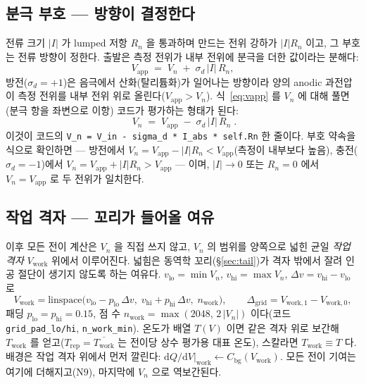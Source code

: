 \documentclass[11pt,a4paper]{article}
\newcommand{\dd}{\mathrm{d}}
\newcommand{\app}{\mathrm{app}}
\newcommand{\bg}{\mathrm{bg}}
\newcommand{\work}{\mathrm{work}}
\newcommand{\code}[1]{\texttt{#1}}
\begin{document}
\subsection{분극 부호 — 방향이 결정한다}
전류 크기 $|I|$ 가 lumped 저항 $R_n$ 을 통과하며 만드는 전위 강하가 $|I|R_n$ 이고, 그 부호는 전류 방향이 정한다.
출발은 측정 전위가 내부 전위에 분극을 더한 값이라는 분해다:
\begin{equation}
V_\app\;=\;V_n\;+\;\sigma_d\,|I|\,R_n,
\label{eq:vapp}
\end{equation}
방전($\sigma_d=+1$)은 음극에서 산화(탈리튬화)가 일어나는 방향이라 양의 anodic 과전압이 측정 전위를 내부 전위 위로
올린다($V_\app>V_n$). 식~\eqref{eq:vapp} 를 $V_n$ 에 대해 풀면(분극 항을 좌변으로 이항) 코드가 평가하는 형태가 된다:
\begin{equation}
\boxed{\;V_n\;=\;V_\app\;-\;\sigma_d\,|I|\,R_n\;.}
\label{eq:vn}
\end{equation}
이것이 코드의 \code{V\_n = V\_in - sigma\_d * I\_abs * self.Rn} 한 줄이다. 부호 약속을 식으로 확인하면 —
방전에서 $V_n=V_\app-|I|R_n<V_\app$(측정이 내부보다 높음), 충전($\sigma_d=-1$)에서 $V_n=V_\app+|I|R_n>V_\app$ — 이며,
$|I|\to0$ 또는 $R_n=0$ 에서 $V_n=V_\app$ 로 두 전위가 일치한다.

\subsection{작업 격자 — 꼬리가 들어올 여유}
이후 모든 전이 계산은 $V_n$ 을 직접 쓰지 않고, $V_n$ 의 범위를 양쪽으로 넓힌 균일 \emph{작업 격자} $V_\work$ 위에서
이루어진다. 넓힘은 동역학 꼬리(\S\ref{sec:tail})가 격자 밖에서 잘려 인공 절단이 생기지 않도록 하는 여유다.
$v_\mathrm{lo}=\min V_n$, $v_\mathrm{hi}=\max V_n$, $\Delta v=v_\mathrm{hi}-v_\mathrm{lo}$ 로
\begin{equation}
V_\work=\mathrm{linspace}\big(v_\mathrm{lo}-p_\mathrm{lo}\,\Delta v,\;
v_\mathrm{hi}+p_\mathrm{hi}\,\Delta v,\;n_\work\big),
\qquad \Delta_\mathrm{grid}=V_{\work,1}-V_{\work,0},
\label{eq:vwork}
\end{equation}
패딩 $p_\mathrm{lo}=p_\mathrm{hi}=0.15$, 점 수 $n_\work=\max(2048,\,2\,|V_n|)$ 이다(코드 \code{grid\_pad\_lo/hi},
\code{n\_work\_min}). 온도가 배열 $T(V)$ 이면 같은 격자 위로 보간해 $T_\work$ 를 얻고($T_\mathrm{rep}=\overline{T_\work}$ 는
전이당 상수 평가용 대표 온도), 스칼라면 $T_\work\equiv T$ 다. 배경은 작업 격자 위에서 먼저 깔린다:
$\dd Q/\dd V|_\work \leftarrow C_\bg(V_\work)$. 모든 전이 기여는 여기에 더해지고($\mathrm N9$), 마지막에 $V_n$ 으로
역보간된다.
\end{document}
